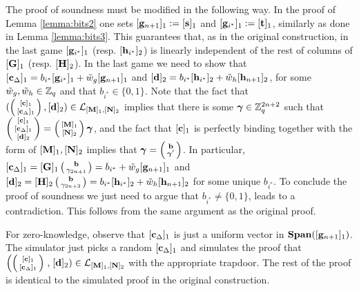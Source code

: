 The proof of soundness must be modified in the following way.  In the proof of Lemma \ref{lemma:bits2} one sets $[\mathbf{g}_{n+1}]_1:=[\mathbf{s}]_1$ and $[\mathbf{g}_{i^*}]_1:=[\mathbf{t}]_1$, similarly as done in Lemma \ref{lemma:bits3}. This guarantees that, as in the original construction, in the last game  $[\mathbf{g}_{i^*}]_1$ (resp. $[\mathbf{h}_{i^*}]_2$) is linearly independent of the rest of columns of $[\mathbf{{G}}]_1$ (resp. $[{\mathbf{{H}}}]_2$). In the last game we need to show that $[\mathbf{c}_{\Delta}]_1=b_{i^*}[\mathbf{g}_{i^*}]_1+\tilde{w}_g[\mathbf{g}_{n+1}]_1$ and $[\mathbf{d}]_2=b_{i^*}[\mathbf{h}_{i^*}]_2+\tilde{w}_h[\mathbf{h}_{n+1}]_2$, for some $\tilde{w}_g,\tilde{w}_h\in\mathbb{Z}_q$ and that $b_{i^*} \in \{0,1\}$. Note that the fact that $(\left(\begin{smallmatrix}{[\mathbf{c}]_1}\\{[\mathbf{c}_\Delta]_1}\end{smallmatrix}\right), {[\mathbf{d}]_2})\in\mathcal{L}_{[\mathbf{{M}}]_1,[\mathbf{{N}}]_2}$ implies that there is some ${\boldsymbol \gamma}\in\mathbb{Z}_q^{2n+2}$ such that $\left(\begin{smallmatrix}{[\mathbf{c}]_1}\\{[\mathbf{c}_\Delta]_1}\\{[\mathbf{d}]_2}\end{smallmatrix}\right)=\left(\begin{smallmatrix}{[\mathbf{{M}}]_1}\\{[\mathbf{{N}}]_2}\end{smallmatrix}\right){\boldsymbol \gamma}$, and the fact that $[\mathbf{c}]_1$ is perfectly binding together with the form of $[\mathbf{{M}}]_1,[\mathbf{{N}}]_2$ implies that ${\boldsymbol \gamma}=\left(\begin{smallmatrix}\mathbf{b}\\{\boldsymbol \gamma}'\end{smallmatrix}\right)$. In particular, $[\mathbf{c}_\Delta]_1 = [\mathbf{{G}}]_1\left(\begin{smallmatrix}\mathbf{b}\\\gamma_{2n+1}\end{smallmatrix}\right)=b_{i^*}+\tilde{w}_g[\mathbf{g}_{n+1}]_1$ and $[\mathbf{d}]_2=[{\mathbf{{H}}}]_2\left(\begin{smallmatrix}\mathbf{b}\\\gamma_{2n+2}\end{smallmatrix}\right)=b_{i^*}[\mathbf{h}_{i^*}]_2+\tilde{w}_h[\mathbf{h}_{n+1}]_2$ for some unique $b_{i^*}$. To conclude the proof of soundness we just need to argue that $b_{i^*} \neq \{0,1\}$, leads to a contradiction. This follows from the same argument as the original proof. 


For zero-knowledge, observe that $[\mathbf{c}_{\Delta}]_1$ is just a uniform vector in $\mathbf{Span}([\mathbf{g}_{n+1}]_1)$. The simulator just picks a random $[\mathbf{c}_{\Delta}]_1$ and simulates the proof that $\left(\left(\begin{smallmatrix}{[\mathbf{c}]_1}\\{[\mathbf{c}_\Delta]_1}\end{smallmatrix}\right)\right.,\allowbreak\left.\allowbreak {[\mathbf{d}]_2}\right)\in\mathcal{L}_{[\mathbf{{M}}]_1,[\mathbf{{N}}]_2}$ with the appropriate trapdoor. The rest of the proof is identical to the simulated proof in the original construction.  


